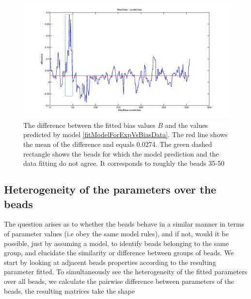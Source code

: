 \documentclass[12pt]{book}
\begin{document}
\begin{figure}[H]
\includegraphics[scale=0.15]{diffFittedBiasVsModelBias}
\caption{\scriptsize{The difference between the fitted bias values $B$ and the values predicted by model \ref{fitModelForExpVsBiasData}. The red line shows the mean of the difference and equals 0.0274. The green dashed rectangle shows the beads for which the model prediction and the data fitting do not agree. It corresponds to roughly the beads 35-50}}
\label{diffFittedBiasVsModelBias}
\end{figure}

\subsection{Heterogeneity of the parameters over the beads}
The question arises as to whether the beads behave in a similar manner in terms of parameter values (i.e obey the same model rules), and if not, would it be possible, just by assuming a model, to identify beads belonging to the same group, and elucidate the similarity or difference between groups of beads. 
We start by looking at adjacent beads properties according to the resulting parameter fitted.
To simultaneously see the heterogeneity of the fitted parameters over all beads, we calculate the pairwise difference between parameters of the beads. 
the resulting matrices take the shape
\end{document}
